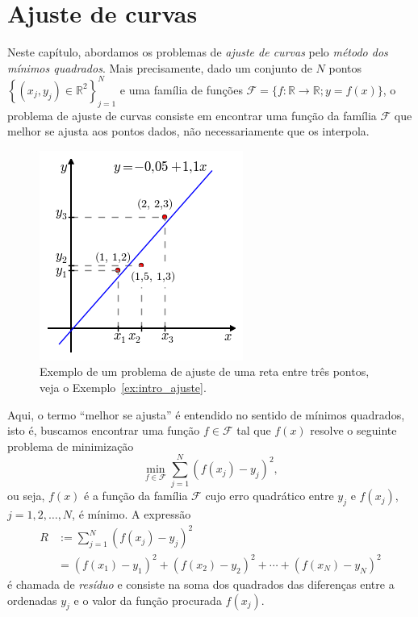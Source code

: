 
\chapter{Ajuste de curvas}

Neste capítulo, abordamos os problemas de \emph{ajuste de curvas} pelo \emph{método dos mínimos quadrados}. Mais precisamente, dado um conjunto de $N$ pontos $\left\{(x_j, y_j)\in \mathbb{R}^2\right\}_{j=1}^N$ e uma família de funções $\mathcal{F} = \{f:\mathbb{R}\to\mathbb{R}; y = f(x)\}$, o problema de ajuste de curvas consiste em encontrar uma função da família $\mathcal{F}$ que melhor se ajusta aos pontos dados, não necessariamente que os interpola.

\begin{figure}[h!]
  \centering
  \includegraphics[scale=0.9]{./cap_ajuste/pics/ex_intro_ajuste/ex_intro_ajuste}
  \caption{Exemplo de um problema de ajuste de uma reta entre três pontos, veja o Exemplo~\ref{ex:intro_ajuste}.}
  \label{fig:ex_intro}
\end{figure}

Aqui, o termo ``melhor se ajusta'' é entendido no sentido de mínimos quadrados, isto é, buscamos encontrar uma função $f\in\mathcal{F}$ tal que $f(x)$ resolve o seguinte problema de minimização
\begin{equation}
  \min_{f\in\mathcal{F}} \sum_{j=1}^N \left(f(x_j) - y_j\right)^2,
\end{equation}
ou seja, $f(x)$ é a função da família $\mathcal{F}$ cujo erro quadrático entre $y_j$ e $f(x_j)$, $j = 1, 2, \dotsc, N$, é mínimo. A expressão
\begin{equation}
  \begin{split}
  R &:= \sum_{j=1}^N \left(f(x_j)-y_j\right)^2 \\
  &= \left(f(x_1)-y_1\right)^2 +  \left(f(x_2)-y_2\right)^2 + \cdots + \left(f(x_N)- y_N\right)^2
  \end{split}
\end{equation}
é chamada de \emph{resíduo} e consiste na soma dos quadrados das diferenças entre a ordenadas $y_j$ e o valor da função procurada $f(x_j)$.

